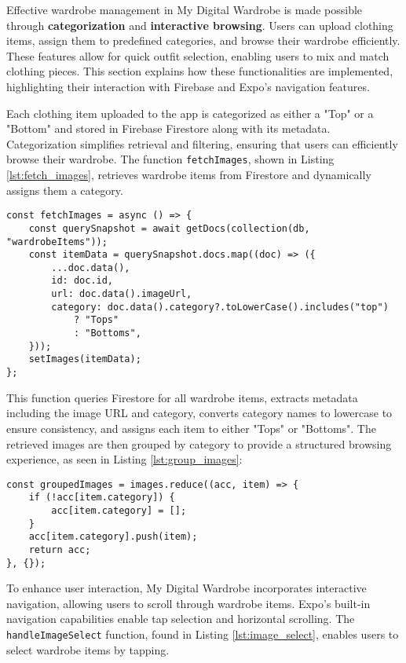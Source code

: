 Effective wardrobe management in \textit{}{My Digital Wardrobe} is made possible through \textbf{ categorization} and \textbf{interactive browsing}. Users can upload clothing items, assign them to predefined categories, and browse their wardrobe efficiently. These features allow for quick outfit selection, enabling users to mix and match clothing pieces. This section explains how these functionalities are implemented, highlighting their interaction with Firebase and Expo's navigation features.

Each clothing item uploaded to the app is categorized as either a "Top" or a "Bottom" and stored in Firebase Firestore along with its metadata. Categorization simplifies retrieval and filtering, ensuring that users can efficiently browse their wardrobe. The function \texttt{fetchImages}, shown in Listing \ref{lst:fetch_images}, retrieves wardrobe items from Firestore and dynamically assigns them a category.

\begin{lstlisting}[caption={Fetch images by category in \texttt{GalleryScreen.js}}, label={lst:fetch_images}]
const fetchImages = async () => {
    const querySnapshot = await getDocs(collection(db, "wardrobeItems"));
    const itemData = querySnapshot.docs.map((doc) => ({
        ...doc.data(),
        id: doc.id,
        url: doc.data().imageUrl,
        category: doc.data().category?.toLowerCase().includes("top")
            ? "Tops"
            : "Bottoms",
    }));
    setImages(itemData);
};
\end{lstlisting}

This function queries Firestore for all wardrobe items, extracts metadata including the image URL and category, converts category names to lowercase to ensure consistency, and assigns each item to either "Tops" or "Bottoms". The retrieved images are then grouped by category to provide a structured browsing experience, as seen in Listing \ref{lst:group_images}:

\begin{lstlisting}[caption={Group images by category}, label={lst:group_images}]
const groupedImages = images.reduce((acc, item) => {
    if (!acc[item.category]) {
        acc[item.category] = [];
    }
    acc[item.category].push(item);
    return acc;
}, {});
\end{lstlisting}

To enhance user interaction, My Digital Wardrobe incorporates interactive navigation, allowing users to scroll through wardrobe items. Expo's built-in navigation capabilities enable tap selection and horizontal scrolling. The \texttt{handleImageSelect} function, found in Listing \ref{lst:image_select}, enables users to select wardrobe items by tapping.

